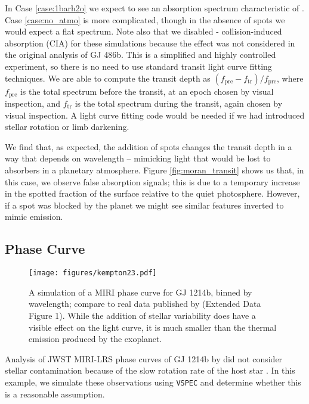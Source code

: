 \documentclass[linenumbers,5p,twocolumn,authoryear]{elsarticle}
\newcommand{\vspec}[1]{\texttt{VSPEC}#1}
\begin{document}
In Case \ref{case:1barh2o} we expect to see an absorption spectrum characteristic of . Case \ref{case:no_atmo} is more complicated, though in the absence of spots we would expect a flat spectrum. Note also that we disabled - collision-induced absorption (CIA) for
these simulations because the effect was not considered in the original analysis of GJ 486b. This is a simplified and highly controlled experiment, so there is no need to use standard transit light curve fitting techniques. We are able to compute the transit depth as $(f_\text{pre}-f_\text{tr})/f_\text{pre}$, where $f_\text{pre}$ is the total spectrum before the transit, at an epoch chosen by visual inspection, and $f_\text{tr}$ is the total spectrum during the transit, again chosen by visual inspection. A light curve fitting code would be needed if we had introduced stellar rotation or limb darkening.

We find that, as expected, the addition of spots changes the transit depth in a way that depends on wavelength -- mimicking light that would be lost to absorbers in a planetary atmosphere. Figure \ref{fig:moran_transit} shows us that, in this case, we observe false absorption signals; this is due to a temporary increase in the spotted fraction of the surface relative to the quiet photosphere. However, if a spot was blocked by the planet we might see similar features inverted to mimic emission.

\subsection{Phase Curve}
\begin{figure}[!htbp]
    \centering
    \texttt{[image: figures/kempton23.pdf]}
    \caption{
        A simulation of a MIRI phase curve for GJ 1214b, binned by wavelength; compare to real data published by \citet{kempton2023}(Extended Data Figure 1). While the addition of stellar variability does have a visible effect on the light curve, it is much smaller than the thermal emission produced by the exoplanet.
        }
    \label{fig:gj1214b}
\end{figure}

Analysis of JWST MIRI-LRS phase curves of GJ 1214b by \citet{kempton2023} did not consider stellar contamination because of the slow rotation rate of the host star \citep[approximately 1/80$^{\text{th}}$ the orbital frequency,][]{cloutier2021}. In this example, we simulate these observations using \vspec{} and determine whether this is a reasonable assumption.
\end{document}
